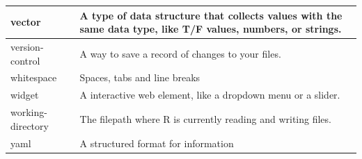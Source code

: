 \documentclass[
  oneside]{book}
\begin{document}
\begin{tabular}{l|l}
\hline
vector & A type of data structure that collects values with the same data type, like T/F values, numbers, or strings.\\
\hline
version-control & A way to save a record of changes to your files.\\
\hline
whitespace & Spaces, tabs and line breaks\\
\hline
widget & A interactive web element, like a dropdown menu or a slider.\\
\hline
working-directory & The filepath where R is currently reading and writing files.\\
\hline
yaml & A structured format for information\\
\hline
\end{tabular}

  
\end{document}
